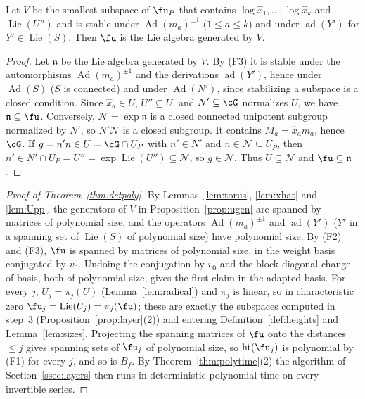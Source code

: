 \begin{proposition}\label{prop:ugen}
Let $V$ be the smallest subspace of $\fu_P$ that contains $\log\hat x_1,\ldots,\log\hat x_k$ and
$\operatorname{Lie}(U'')$ and is stable under $\operatorname{Ad}(m_a)^{\pm1}$ ($1\le a\le k$) and under $\operatorname{ad}(Y')$ for $Y'\in\operatorname{Lie}(S)$.
Then $\fu$ is the Lie algebra generated by $V$.
\end{proposition}
\begin{proof}
Let $\mathfrak n$ be the Lie algebra generated by $V$. By (F3) it is stable under the automorphisms
$\operatorname{Ad}(m_a)^{\pm1}$ and the derivations $\operatorname{ad}(Y')$, hence under $\operatorname{Ad}(S)$ ($S$ is connected) and under
$\operatorname{Ad}(N')$, since stabilizing a subspace is a closed condition. Since $\hat x_a\in U$, $U''\subseteq U$, and
$N'\subseteq\cG$ normalizes $U$, we have $\mathfrak n\subseteq\fu$. Conversely, $\mathcal N=\exp\mathfrak n$ is a closed
connected unipotent subgroup normalized by $N'$, so $N'\mathcal N$ is a closed subgroup. It contains
$M_a=\hat x_am_a$, hence $\cG$. If $g=n'n\in U=\cG\cap U_P$ with $n'\in N'$ and $n\in\mathcal N\subseteq U_P$, then
$n'\in N'\cap U_P=U''=\exp\operatorname{Lie}(U'')\subseteq\mathcal N$, so $g\in\mathcal N$. Thus $U\subseteq\mathcal N$ and
$\fu\subseteq\mathfrak n$.
\end{proof}

\begin{proof}[Proof of Theorem~\ref{thm:detpoly}]
By Lemmas~\ref{lem:torus}, \ref{lem:xhat} and \ref{lem:Upp}, the generators of $V$ in
Proposition~\ref{prop:ugen} are spanned by matrices of polynomial size, and the operators $\operatorname{Ad}(m_a)^{\pm1}$ and
$\operatorname{ad}(Y')$ ($Y'$ in a spanning set of $\operatorname{Lie}(S)$ of polynomial size) have polynomial size. By (F2) and (F3),
$\fu$ is spanned by matrices of polynomial size, in the weight basis conjugated by $v_0$. Undoing the
conjugation by $v_0$ and the block diagonal change of basis, both of polynomial size, gives the first
claim in the adapted basis. For every $j$, $U_j=\pi_j(U)$ (Lemma~\ref{lem:radical}) and $\pi_j$ is linear, so in characteristic zero
$\fu_j=\operatorname{Lie}(U_j)=\pi_j(\fu)$; these are exactly the subspaces computed in step~3
(Proposition~\ref{prop:layer}(2)) and entering Definition~\ref{def:heights} and Lemma~\ref{lem:sizes}.
Projecting the spanning matrices of $\fu$ onto the distances $\le j$ gives spanning sets of $\fu_j$ of
polynomial size, so $\operatorname{ht}(\fu_j)$ is polynomial by (F1) for every $j$, and so is $B_f$. By
Theorem~\ref{thm:polytime}(2) the algorithm of Section~\ref{ssec:layers} then runs in deterministic polynomial
time on every invertible series.
\end{proof}

